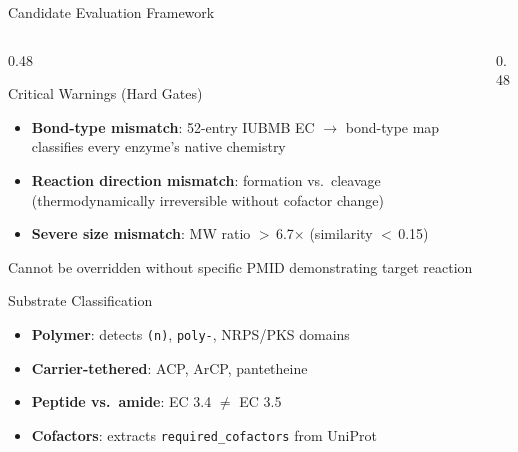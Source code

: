 \documentclass[aspectratio=169, 11pt]{beamer}
\begin{document}
\begin{frame}{Candidate Evaluation Framework}
\vspace{-6pt}

\begin{columns}[T]
\begin{column}{0.48\textwidth}

\begin{alertblock}{\small Critical Warnings (Hard Gates)}
\vspace{-2pt}
\begin{itemize}\scriptsize
\setlength\itemsep{1pt}
\item \textbf{Bond-type mismatch}: 52-entry IUBMB EC $\rightarrow$ bond-type map classifies every enzyme's native chemistry
\item \textbf{Reaction direction mismatch}: formation vs.\ cleavage (thermodynamically irreversible without cofactor change)
\item \textbf{Severe size mismatch}: MW ratio $>$\,6.7$\times$ (similarity $<$\,0.15)
\end{itemize}
\vspace{1pt}
{\tiny\color{accentred} Cannot be overridden without specific PMID demonstrating target reaction}
\end{alertblock}

\vspace{2pt}
\begin{block}{\small Substrate Classification}
\vspace{-2pt}
\begin{itemize}\scriptsize
\setlength\itemsep{1pt}
\item \textbf{Polymer}: detects \texttt{(n)}, \texttt{poly-}, NRPS/PKS domains
\item \textbf{Carrier-tethered}: ACP, ArCP, pantetheine
\item \textbf{Peptide vs.\ amide}: EC 3.4 $\neq$ EC 3.5
\item \textbf{Cofactors}: extracts \texttt{required\_cofactors} from UniProt
\end{itemize}
\end{block}

\end{column}
\begin{column}{0.48\textwidth}


\end{column}
\end{columns}
\end{frame}
\end{document}
